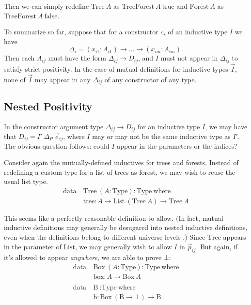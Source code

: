 \documentclass{report}
\newcommand{\Tree}{\const{Tree}}
\newcommand{\Forest}{\const{Forest}}
\newcommand{\TreeForest}{\const{TreeForest}}
\newcommand{\tree}{\const{tree}}
\newcommand{\true}{\const{true}}
\newcommand{\false}{\const{false}}
\newcommand{\const}[1]{\text{#1}}
\newcommand{\data}{\const{data}}
\newcommand{\Type}{\const{Type}}
\newcommand{\where}{\const{where}}
\begin{document}
Then we can simply redefine $\Tree ~ A$ as $\TreeForest ~ A ~ \true$ and $\Forest ~ A$ as $\TreeForest ~ A ~ \false$.

To summarize so far, suppose that for a constructor $c_i$ of an inductive type $I$ we have $$\Delta_i = (x_{i1}: A_{i1}) \to \dots \to (x_{im}: A_{im}).$$ Then each $A_{ij}$ must have the form $\Delta_{ij} \to D_{ij}$, and $I$ must not appear in $\Delta_{ij}$ to satisfy strict positivity. In the case of mutual definitions for inductive types $\Vec{I}$, none of $\Vec{I}$ may appear in any $\Delta_{ij}$ of any constructor of any type.

\subsection{Nested Positivity}

In the constructor argument type $\Delta_{ij} \to D_{ij}$ for an inductive type $I$, we may have that $D_{ij} = I' ~ \Delta_P ~ \Vec{e}_{ij}$, where $I$ may or may not be the same inductive type as $I'$. The obvious question follows: could $I$ appear in the parameters or the indices?

Consider again the mutually-defined inductives for trees and forests. Instead of redefining a custom type for a list of trees as forest, we may wish to reuse the usual list type.
%
\begin{align*}
    \data ~ &\Tree ~ (A: \Type) : \Type ~ \where \\
    &\tree : A \to \const{List} ~ (\Tree ~ A) \to \Tree ~ A
\end{align*}

This seems like a perfectly reasonable definition to allow. (In fact, mutual inductive definitions may generally be desugared into nested inductive definitions, even when the definitions belong to different universe levels \parencite[Section 8.6.3]{semantical-inductive}.) Since $\Tree$ appears in the parameter of $\const{List}$, we may generally wish to allow $I$ in $\Vec{p}_{ij}$. But again, if it's allowed to appear \emph{anywhere}, we are able to prove $\bot$:
%
\begin{align*}
    \data ~ &\const{Box} ~ (A: \Type) : \Type ~ \where \\
    &\const{box} : A \to \const{Box} ~ A \\
    \\
    \data ~ &\const{B} ~ : \Type ~ \where \\
    &\const{b} : \const{Box} ~ (\const{B} \to \bot) \to \const{B}
\end{align*}
\end{document}
